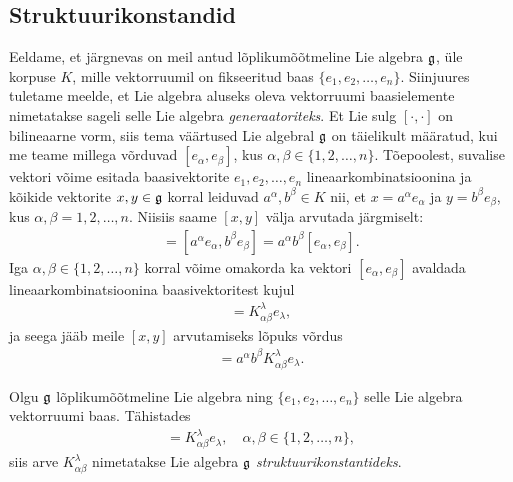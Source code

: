 \subsection{Struktuurikonstandid}

Eeldame, et järgnevas on meil antud lõplikumõõtmeline Lie algebra $\mathfrak{g}$,
üle korpuse $K$, mille vektorruumil on fikseeritud baas
$\{ e_1, e_2, \dots, e_n \}$. Siinjuures tuletame meelde, et Lie algebra
aluseks oleva vektorruumi baasielemente nimetatakse sageli selle
Lie algebra \emph{generaatoriteks}. Et Lie sulg
$[\cdot, \cdot]$ on bilineaarne vorm, siis tema väärtused Lie algebral
$\mathfrak{g}$ on täielikult määratud, kui me teame millega võrduvad
$[e_\alpha, e_\beta]$, kus $\alpha, \beta \in \{1, 2, \dots, n\}$.
Tõepoolest, suvalise vektori võime esitada baasivektorite
$e_1, e_2, \dots, e_n$ lineaarkombinatsioonina ja kõikide vektorite
$x, y \in \mathfrak{g}$ korral leiduvad $a^\alpha, b^\beta \in K$ nii, et
$x = a^\alpha e_\alpha$ ja $y = b^\beta e_\beta$, kus
$\alpha, \beta = 1, 2, \dots, n$. Niisiis saame $[x, y]$ välja arvutada
järgmiselt:
\begin{align*}
    [x, y] = [a^\alpha e_\alpha, b^\beta e_\beta] =
    a^\alpha b^\beta [e_\alpha, e_\beta].
\end{align*}
Iga $\alpha, \beta \in \{1, 2, \dots, n\}$ korral võime omakorda ka
vektori $[e_\alpha, e_\beta]$ avaldada lineaarkombinatsioonina
baasivektoritest kujul
\begin{align*}
    [e_\alpha, e_\beta] = K_{\alpha \beta}^{\lambda} e_\lambda,
\end{align*}
ja seega jääb meile $[x, y]$ arvutamiseks lõpuks võrdus
\begin{align*}
    [x, y] = a^\alpha b^\beta K_{\alpha \beta}^{\lambda} e_\lambda.
\end{align*}

\begin{dfn}
    Olgu $\mathfrak{g}$ lõplikumõõtmeline Lie algebra ning $\{ e_1, e_2, \dots, e_n \}$
    selle Lie algebra vektorruumi baas. Tähistades
    \begin{align*}
        [e_\alpha, e_\beta] = K_{\alpha \beta}^{\lambda} e_\lambda, \quad
        \alpha, \beta \in \{1, 2, \dots, n\},
    \end{align*}
    siis arve $K_{\alpha \beta}^{\lambda}$ nimetatakse Lie algebra $\mathfrak{g}$
    \emph{struktuurikonstantideks}.
\end{dfn}

